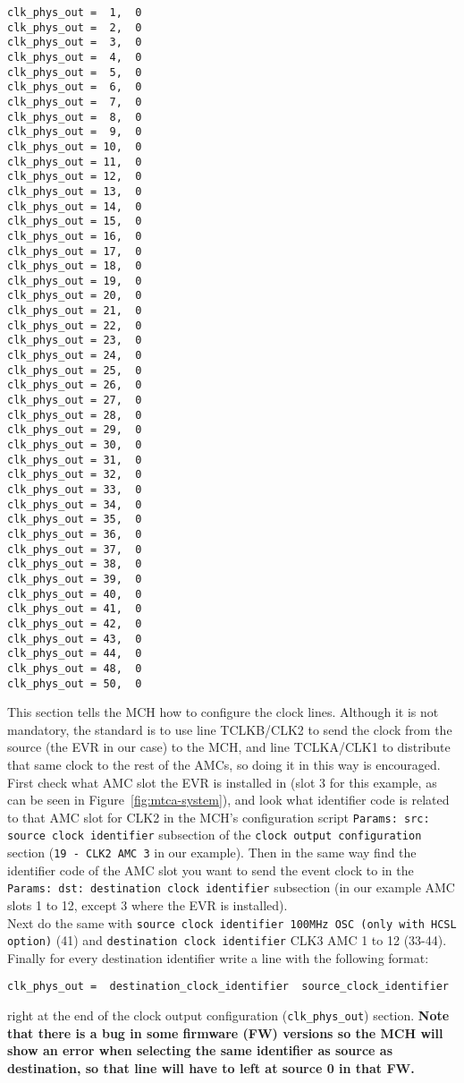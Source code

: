\documentclass[11pt
  , a4paper
  , article
  , oneside
  , showtrims
]{memoir}
\begin{document}
\begin{lstlisting}[style=termstyle]
clk_phys_out =  1,  0
clk_phys_out =  2,  0
clk_phys_out =  3,  0
clk_phys_out =  4,  0
clk_phys_out =  5,  0
clk_phys_out =  6,  0
clk_phys_out =  7,  0
clk_phys_out =  8,  0
clk_phys_out =  9,  0
clk_phys_out = 10,  0
clk_phys_out = 11,  0
clk_phys_out = 12,  0
clk_phys_out = 13,  0
clk_phys_out = 14,  0
clk_phys_out = 15,  0
clk_phys_out = 16,  0
clk_phys_out = 17,  0
clk_phys_out = 18,  0
clk_phys_out = 19,  0
clk_phys_out = 20,  0
clk_phys_out = 21,  0
clk_phys_out = 22,  0
clk_phys_out = 23,  0
clk_phys_out = 24,  0
clk_phys_out = 25,  0
clk_phys_out = 26,  0
clk_phys_out = 27,  0
clk_phys_out = 28,  0
clk_phys_out = 29,  0
clk_phys_out = 30,  0
clk_phys_out = 31,  0
clk_phys_out = 32,  0
clk_phys_out = 33,  0
clk_phys_out = 34,  0
clk_phys_out = 35,  0
clk_phys_out = 36,  0
clk_phys_out = 37,  0
clk_phys_out = 38,  0
clk_phys_out = 39,  0
clk_phys_out = 40,  0
clk_phys_out = 41,  0
clk_phys_out = 42,  0
clk_phys_out = 43,  0
clk_phys_out = 44,  0
clk_phys_out = 48,  0
clk_phys_out = 50,  0

\end{lstlisting}

This section tells the MCH how to configure the clock lines. Although it is not mandatory, the standard is to use line TCLKB/CLK2 to send the clock from the source (the EVR in our case) to the MCH, and line TCLKA/CLK1 to distribute that same clock to the rest of the AMCs, so doing it in this way is encouraged. First check what AMC slot the EVR is installed in (slot 3 for this example, as can be seen in Figure~\ref{fig:mtca-system}), and look what identifier code is related to that AMC slot for CLK2 in the MCH's configuration script \texttt{Params: src: source clock identifier} subsection of the \texttt{clock output configuration} section (\texttt{19 -  CLK2 AMC  3} in our example). Then in the same way find the identifier code of the AMC slot you want to send the event clock to in the \texttt{Params: dst: destination clock identifier} subsection (in our example AMC slots 1 to 12, except 3 where the EVR is installed).\\

Next do the same with \texttt{source clock identifier 100MHz OSC (only with HCSL option)} (41) and \texttt{destination clock identifier} CLK3 AMC 1 to 12 (33-44).\\

Finally for every destination identifier write a line with the following format:
\begin{lstlisting}[style=termstyle]
clk_phys_out =  destination_clock_identifier  source_clock_identifier
\end{lstlisting}
right at the end of the clock output configuration (\texttt{clk\_phys\_out}) section. \textbf{Note that there is a bug in some firmware (FW) versions so the MCH will show an error when selecting the same identifier as source as destination, so that line will have to left at source 0 in that FW.}\\
\end{document}
